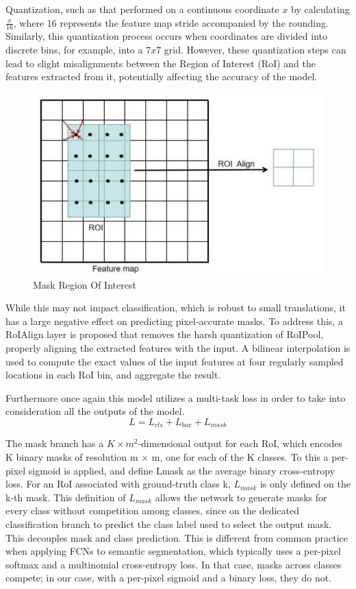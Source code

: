 Quantization, such as that performed on a continuous coordinate $x$ by calculating \(\frac{x}{16}\), where 16 represents the feature map stride accompanied
by the rounding. Similarly, this quantization process occurs when coordinates are divided into discrete bins, for example, into a $7x7$ grid. However, these 
quantization steps can lead to slight misalignments between the Region of Interest (RoI) and the features extracted from it, potentially affecting the accuracy 
of the model.

\begin{figure}[h!]
    \centering
    \includegraphics[scale=0.30]{Figures/mask-r-cnn-roi-align.png}
    \caption{Mask Region Of Interest}
    \label{fig:roi-align}
\end{figure}

While this may not impact classification, which is robust to small translations, it has a large negative effect on predicting pixel-accurate masks.
To address this, a RoIAlign layer is proposed that removes the harsh quantization of RoIPool, properly aligning the extracted features with the input. 
A bilinear interpolation is used to compute the exact values of the input features at four regularly sampled locations in each RoI bin, and aggregate 
the result.

Furthermore once again this model utilizes a multi-task loss in order to take into consideration all the outputs of the model.
\[
L = L_{cls} + L_{box} + L_{mask} 
\]
 
The mask branch has a $K \times m^2$-dimensional output for each RoI, which encodes K binary masks of resolution m × m, one for each of the K classes.
To this a per-pixel sigmoid is applied, and define Lmask as the average binary cross-entropy loss. For an RoI associated with ground-truth class k, 
$L_{mask}$ is only defined on the k-th mask. This definition of $L_{mask}$ allows the network to generate masks for every class without competition 
among classes, since on the dedicated classification branch to predict the class label used to select the output mask. This decouples mask and 
class prediction. This is different from common practice when applying FCNs to semantic segmentation, which typically uses a per-pixel softmax and a 
multinomial cross-entropy loss. In that case, masks across classes compete; in our case, with a per-pixel sigmoid and a binary
loss, they do not.


